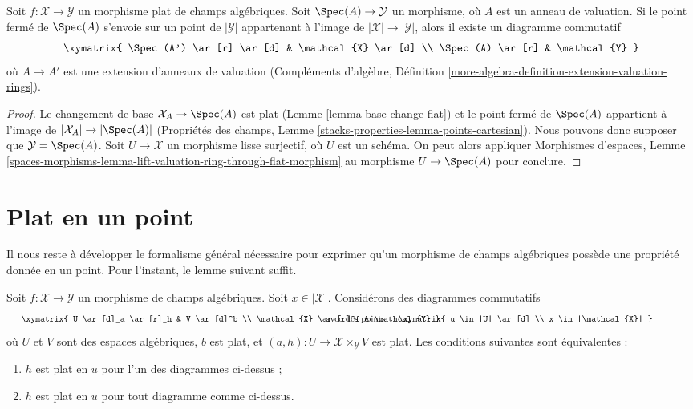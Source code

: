 \begin{lemma}
\label{lemma-lift-valuation-ring-through-flat-morphism}
Soit $f : \mathcal{X} \to \mathcal{Y}$ un morphisme plat de champs
algébriques. Soit $\Spec(A) \to \mathcal{Y}$ un morphisme, où $A$ est un
anneau de valuation. Si le point fermé de $\Spec(A)$ s'envoie sur un point de
$|\mathcal{Y}|$ appartenant à l'image de
$|\mathcal{X}| \to |\mathcal{Y}|$, alors il existe un diagramme commutatif
$$
\xymatrix{
\Spec(A') \ar[r] \ar[d] & \mathcal{X} \ar[d] \\
\Spec(A) \ar[r] & \mathcal{Y}
}
$$
où $A \to A'$ est une extension d'anneaux de valuation
(Compléments d'algèbre, Définition
\ref{more-algebra-definition-extension-valuation-rings}).
\end{lemma}

\begin{proof}
Le changement de base $\mathcal{X}_A \to \Spec(A)$ est plat
(Lemme \ref{lemma-base-change-flat}) et le point fermé de
$\Spec(A)$ appartient à l'image de $|\mathcal{X}_A| \to |\Spec(A)|$
(Propriétés des champs,
Lemme \ref{stacks-properties-lemma-points-cartesian}).
Nous pouvons donc supposer que $\mathcal{Y} = \Spec(A)$. Soit
$U \to \mathcal{X}$ un morphisme lisse surjectif, où $U$ est un schéma.
On peut alors appliquer Morphismes d'espaces, Lemme
\ref{spaces-morphisms-lemma-lift-valuation-ring-through-flat-morphism}
au morphisme $U \to \Spec(A)$ pour conclure.
\end{proof}







\section{Plat en un point}
\label{section-flat-at-point}

\noindent
Il nous reste à développer le formalisme général nécessaire pour exprimer
qu'un morphisme de champs algébriques possède une propriété donnée en un
point. Pour l'instant, le lemme suivant suffit.

\begin{lemma}
\label{lemma-flat-at-point}
Soit $f : \mathcal{X} \to \mathcal{Y}$ un morphisme de champs algébriques.
Soit $x \in |\mathcal{X}|$. Considérons des diagrammes commutatifs
$$
\vcenter{
\xymatrix{
U \ar[d]_a \ar[r]_h & V \ar[d]^b \\
\mathcal{X} \ar[r]^f & \mathcal{Y}
}
}
\quad\text{avec des points}
\vcenter{
\xymatrix{
u \in |U| \ar[d] \\
x \in |\mathcal{X}|
}
}
$$
où $U$ et $V$ sont des espaces algébriques, $b$ est plat, et
$(a, h) : U \to \mathcal{X} \times_\mathcal{Y} V$
est plat. Les conditions suivantes sont équivalentes :
\begin{enumerate}
\item $h$ est plat en $u$ pour l'un des diagrammes ci-dessus ;
\item $h$ est plat en $u$ pour tout diagramme comme ci-dessus.
\end{enumerate}
\end{lemma}

